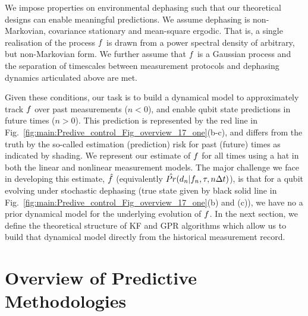 We impose properties on environmental dephasing such that our theoretical designs can enable meaningful predictions. We assume dephasing is non-Markovian, covariance stationary and mean-square ergodic.  That is, a single realisation of the process $f$ is drawn from a power spectral density of arbitrary, but non-Markovian form. We further assume that $f$ is a Gaussian process and the separation of timescales between measurement protocols and dephasing dynamics articulated above are met.

Given these conditions, our task is to build a dynamical model to approximately track $f$ over past measurements ($n<0$), and enable qubit state predictions in future times ($n>0$).  This prediction is represented by the red line in Fig.~\ref{fig:main:Predive_control_Fig_overview_17_one}(b-c), and differs from the truth by the so-called estimation (prediction) risk for past (future) times as indicated by shading.  We represent our estimate of $f$ for all times using a hat in both the linear and nonlinear measurement models.  The major challenge we face in developing this estimate, $\hat{f}$ (equivalently $\hat{Pr}(d_n | f_n, \tau, n\Delta t)$), is that for a qubit evolving under stochastic dephasing (true state given by black solid line in Fig.~\ref{fig:main:Predive_control_Fig_overview_17_one}(b) and (c)), we have no a prior dynamical model for the underlying evolution of $f$.  In the next section, we define the theoretical structure of KF and GPR algorithms which allow us to build that dynamical model directly from the historical measurement record. 




\section{Overview of Predictive Methodologies \label{sec:main:OverviewofPredictive Methodologies}}

